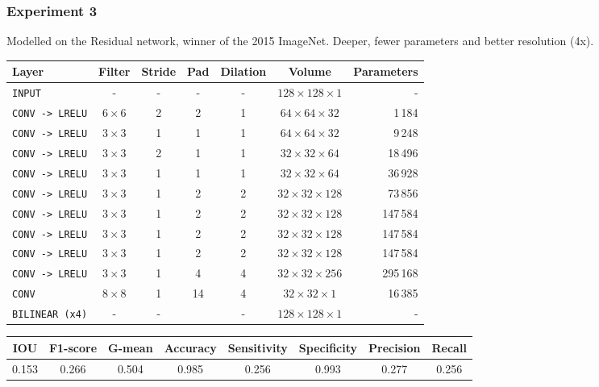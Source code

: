 \documentclass{beamer}
\begin{document}
	\begin{frame}
		\frametitle{Experiment 3}
		Modelled on the Residual network, winner of the 2015 ImageNet. Deeper, fewer parameters and better resolution (4x).
		\footnotesize
		\begin{table}[h]
			\centering
			\begin{tabular}{lcccccr}
			\hline
			\textbf{Layer} & \textbf{Filter} & \textbf{Stride} & \textbf{Pad} & \textbf{Dilation} & \textbf{Volume} & \textbf{Parameters} \\
			\hline
			\texttt{INPUT}	&- & -	& - & - & $128 \times 128 \times 1$ & -\\
			\texttt{CONV -> LRELU}	& $6 \times 6$ & 2 & 2 & 1 & $64 \times 64 \times 32$ & 1\,184\\
			\texttt{CONV -> LRELU}	& $3 \times 3$ & 1 & 1 & 1 & $64 \times 64 \times 32$ & 9\,248\\
			\texttt{CONV -> LRELU}	& $3 \times 3$ & 2 & 1 & 1 & $32 \times 32 \times 64$ & 18\,496\\
			\texttt{CONV -> LRELU}	& $3 \times 3$ & 1 & 1 & 1 & $32 \times 32 \times 64$ & 36\,928\\
			\texttt{CONV -> LRELU}	& $3 \times 3$ & 1 & 2 & 2 & $32 \times 32 \times 128$ & 73\,856\\
			\texttt{CONV -> LRELU}	& $3 \times 3$ & 1 & 2 & 2 & $32 \times 32 \times 128$ & 147\,584\\
			\texttt{CONV -> LRELU}	& $3 \times 3$ & 1 & 2 & 2 & $32 \times 32 \times 128$ & 147\,584\\
			\texttt{CONV -> LRELU}	& $3 \times 3$ & 1 & 2 & 2 & $32 \times 32 \times 128$ & 147\,584\\
			\texttt{CONV -> LRELU}	& $3 \times 3$ & 1 & 4 & 4 & $32 \times 32 \times 256$ & 295\,168\\
			\texttt{CONV}	& $8 \times 8$ & 1 & 14 & 4 & $32 \times 32 \times 1$ & 16\,385\\
			\texttt{BILINEAR (x4)}		& - & - && - & $128 \times 128 \times 1$ & -\\
			\hline
			\end{tabular}
		\end{table}
		
		\scriptsize
		\begin{table}[h]
			\centering
			\begin{tabular}{cccccccc}
			\hline
			\textbf{IOU}	& \textbf{F1-score}	& \textbf{G-mean} &\textbf{Accuracy}	& \textbf{Sensitivity} & \textbf{Specificity} & \textbf{Precision} & \textbf{Recall}\\
			\hline
			0.153 & 0.266 & 0.504 & 0.985 & 0.256 & 0.993 & 0.277 & 0.256\\
			\hline
			\end{tabular}
		\end{table}
	\end{frame}
\end{document}
